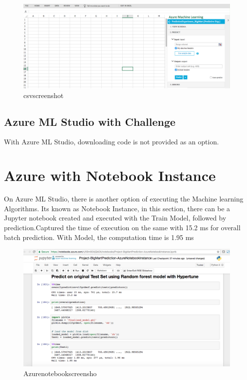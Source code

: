 \begin{figure}[pic9]
 \centering\includegraphics[width=\columnwidth]
{Images/mlstudio/csvscreenshot.png}
 \caption{csvscreenshot}\label{fig:csvscreenshot}
\end{figure}

\subsection{Azure ML Studio with Challenge}
With Azure ML Studio, downloading code is not provided as an option.

\section{Azure with Notebook Instance}

On Azure ML Studio, there is another option of executing the Machine 
learning Algorithms. Its known as Notebook Instance, in this section, 
there can be a Jupyter notebook created and executed with the Train Model, 
followed by prediction.Captured the time of execution on the same with 15.2 ms 
for overall batch prediction. With Model, the computation time is 1.95 ms

\begin{figure}[pic9]
\centering\includegraphics[width=\columnwidth]
{Images/Azurenotebookscreenshot.png}
	\caption{Azurenotebookscreensho}
\label{fig:Azurenotebookscreensho}
\end{figure}

